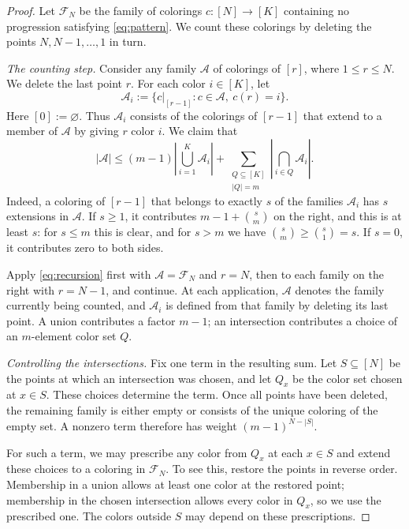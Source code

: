 \documentclass[11pt]{article}
\theoremstyle{remark}
\numberwithin{equation}{section}
\newcommand{\calF}{\mathcal F}
\newcommand{\calA}{\mathcal A}
\begin{document}
\begin{proof}
Let $\calF_N$ be the family of colorings $c:[N]\to[K]$ containing no progression satisfying \eqref{eq:pattern}. We count these colorings by deleting the points $N,N-1,\ldots,1$ in turn.

\emph{The counting step.}
Consider any family $\calA$ of colorings of $[r]$, where $1\leq r\leq N$. We delete the last point $r$. For each color $i\in[K]$, let
\[
 \calA_i:=\{c|_{[r-1]}:c\in\calA,\ c(r)=i\}.
\]
Here $[0]:=\varnothing$. Thus $\calA_i$ consists of the colorings of $[r-1]$ that extend to a member of $\calA$ by giving $r$ color $i$. We claim that
\begin{equation}\label{eq:recursion}
 |\calA|\leq(m-1)\left|\bigcup_{i=1}^K\calA_i\right|
 +\sum_{\substack{Q\subseteq[K]\\|Q|=m}}
 \left|\bigcap_{i\in Q}\calA_i\right|.
\end{equation}
Indeed, a coloring of $[r-1]$ that belongs to exactly $s$ of the families $\calA_i$ has $s$ extensions in $\calA$. If $s\geq1$, it contributes $m-1+\binom sm$ on the right, and this is at least $s$: for $s\leq m$ this is clear, and for $s>m$ we have $\binom sm\geq\binom s1=s$. If $s=0$, it contributes zero to both sides.

Apply \eqref{eq:recursion} first with $\calA=\calF_N$ and $r=N$, then to each family on the right with $r=N-1$, and continue. At each application, $\calA$ denotes the family currently being counted, and $\calA_i$ is defined from that family by deleting its last point. A union contributes a factor $m-1$; an intersection contributes a choice of an $m$-element color set $Q$.

\emph{Controlling the intersections.}
Fix one term in the resulting sum. Let $S\subseteq[N]$ be the points at which an intersection was chosen, and let $Q_x$ be the color set chosen at $x\in S$. These choices determine the term. Once all points have been deleted, the remaining family is either empty or consists of the unique coloring of the empty set. A nonzero term therefore has weight $(m-1)^{N-|S|}$.

For such a term, we may prescribe any color from $Q_x$ at each $x\in S$ and extend these choices to a coloring in $\calF_N$. To see this, restore the points in reverse order. Membership in a union allows at least one color at the restored point; membership in the chosen intersection allows every color in $Q_x$, so we use the prescribed one. The colors outside $S$ may depend on these prescriptions.


\end{proof}
\end{document}
